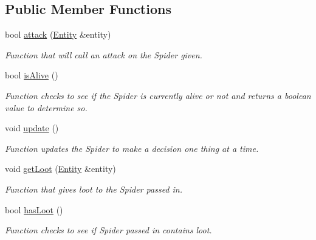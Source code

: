 \subsection*{Public Member Functions}
\begin{DoxyCompactItemize}
\item 
bool \hyperlink{classEntitySpider_a2615ae9c4cda9978b94a8a701bf8d913}{attack} (\hyperlink{classEntity}{Entity} \&entity)
\begin{DoxyCompactList}\small\item\em Function that will call an attack on the Spider given. \item\end{DoxyCompactList}\item 
bool \hyperlink{classEntitySpider_afcdcadef8e129a3ef4c4bf883c237065}{isAlive} ()
\begin{DoxyCompactList}\small\item\em Function checks to see if the Spider is currently alive or not and returns a boolean value to determine so. \item\end{DoxyCompactList}\item 
\hypertarget{classEntitySpider_a87723ab12cad2aac03f45abec5ce138c}{
void \hyperlink{classEntitySpider_a87723ab12cad2aac03f45abec5ce138c}{update} ()}
\label{classEntitySpider_a87723ab12cad2aac03f45abec5ce138c}

\begin{DoxyCompactList}\small\item\em Function updates the Spider to make a decision one thing at a time. \item\end{DoxyCompactList}\item 
void \hyperlink{classEntitySpider_a5689fd02690ec82fc7552043ed659ce9}{getLoot} (\hyperlink{classEntity}{Entity} \&entity)
\begin{DoxyCompactList}\small\item\em Function that gives loot to the Spider passed in. \item\end{DoxyCompactList}\item 
bool \hyperlink{classEntitySpider_a3df1dba43521c84cfb50cd5f0c3abd67}{hasLoot} ()
\begin{DoxyCompactList}\small\item\em Function checks to see if Spider passed in contains loot. \item\end{DoxyCompactList}\end{DoxyCompactItemize}


